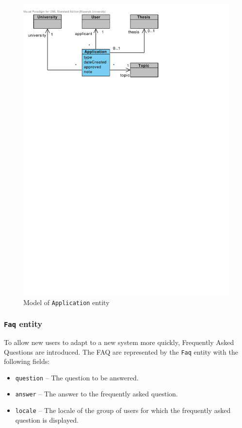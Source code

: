 \begin{figure}[h]
    \centering
        \includegraphics[trim=10 630 200 30, clip, keepaspectratio, width=\textwidth]{./images/domain-application-entity.pdf}
    \caption{Model of \texttt{Application} entity}
    \label{fig:domain-application-entity}
\end{figure}

\subsubsection{\textbf{\texttt{Faq} entity}}

To allow new users to adapt to a new system more quickly, Frequently Asked Questions are introduced. The FAQ are represented by the \texttt{Faq} entity with the following fields:

\begin{itemize}
    \item \texttt{question} -- The question to be answered.
    \item \texttt{answer} -- The answer to the frequently asked question.
    \item \texttt{locale} -- The locale of the group of users for which the frequently asked question is displayed.
\end{itemize}

